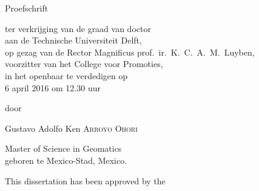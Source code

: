 \begin{titlepage}
\null%
\label{thesis:title}
\vspace{3em}%
\begin{center}

\vspace*{4\baselineskip}

{\makeatletter
\fanciestfont\huge\@title%
\makeatother}
\vfill


{\Large Proefschrift}

\medskip

{ter verkrijging van de graad van doctor \\
aan de Technische Universiteit Delft, \\
op gezag van de Rector Magnificus prof.~ir.~K.~C.~A.~M.~Luyben, \\
voorzitter van het College voor Promoties, \\
in het openbaar te verdedigen op \\
6 april 2016 om 12.30 uur}

\medskip

door

\medskip

\makeatletter
{\Large Gustavo Adolfo Ken {\scshape Arroyo Ohori}}
\makeatother

\medskip

Master of Science in Geomatics \\
geboren te Mexico-Stad, Mexico.

\end{center}
\end{titlepage}

\clearpage
\thispagestyle{empty}
\null%
\label{thesis:committee}
\vfill
{}

\noindent This dissertation has been approved by the

